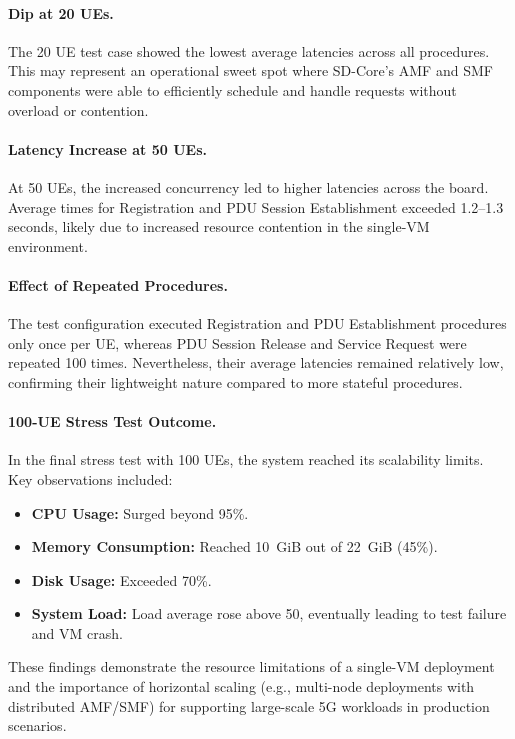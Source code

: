 \paragraph{Dip at 20 UEs.}
The 20 UE test case showed the lowest average latencies across all procedures. This may represent an operational sweet spot where SD-Core's AMF and SMF components were able to efficiently schedule and handle requests without overload or contention.

\paragraph{Latency Increase at 50 UEs.}
At 50 UEs, the increased concurrency led to higher latencies across the board. Average times for Registration and PDU Session Establishment exceeded 1.2--1.3 seconds, likely due to increased resource contention in the single-VM environment.

\paragraph{Effect of Repeated Procedures.}
The test configuration executed Registration and PDU Establishment procedures only once per UE, whereas PDU Session Release and Service Request were repeated 100 times. Nevertheless, their average latencies remained relatively low, confirming their lightweight nature compared to more stateful procedures.

\paragraph{100-UE Stress Test Outcome.}
In the final stress test with 100 UEs, the system reached its scalability limits. Key observations included:
\begin{itemize}
  \item \textbf{CPU Usage:} Surged beyond 95\%.
  \item \textbf{Memory Consumption:} Reached 10~GiB out of 22~GiB (45\%).
  \item \textbf{Disk Usage:} Exceeded 70\%.
  \item \textbf{System Load:} Load average rose above 50, eventually leading to test failure and VM crash.
\end{itemize}

These findings demonstrate the resource limitations of a single-VM deployment and the importance of horizontal scaling (e.g., multi-node deployments with distributed AMF/SMF) for supporting large-scale 5G workloads in production scenarios.


